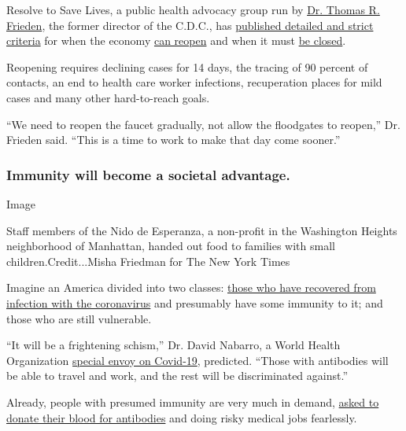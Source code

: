 Resolve to Save Lives, a public health advocacy group run by
\href{https://resolvetosavelives.org/about/team/tom-frieden}{Dr. Thomas
R. Frieden}, the former director of the C.D.C., has
\href{https://vitalstrategies.zoom.us/rec/play/uJUkIe2t-m83SYeSsgSDA6UsW426e6qs1iBIq6Zeyk7kUHkCZlL0YLcSZOrv8sWG1OUPpKL9uf0WUssz?continueMode=true}{published
detailed and strict criteria} for when the economy
\href{https://preventepidemics.org/wp-content/uploads/2020/04/COV020_WhenHowLoosenFaucet_v4.pdf}{can
reopen} and when it must
\href{https://preventepidemics.org/wp-content/uploads/2020/04/COV020_WhenHowTightenFaucet_v3.pdf}{be
closed}.

Reopening requires declining cases for 14 days, the tracing of 90
percent of contacts, an end to health care worker infections,
recuperation places for mild cases and many other hard-to-reach goals.

``We need to reopen the faucet gradually, not allow the floodgates to
reopen,'' Dr. Frieden said. ``This is a time to work to make that day
come sooner.''

\hypertarget{immunity-will-become-a-societal-advantage}{%
\subsubsection{Immunity will become a societal
advantage.}\label{immunity-will-become-a-societal-advantage}}

Image

Staff members of the Nido de Esperanza, a non-profit in the Washington
Heights neighborhood of Manhattan, handed out food to families with
small children.Credit...Misha Friedman for The New York Times

Imagine an America divided into two classes:
\href{https://www.nytimes.com/2020/04/11/us/coronavirus-survivors.html}{those
who have recovered from infection with the coronavirus} and presumably
have some immunity to it; and those who are still vulnerable.

``It will be a frightening schism,'' Dr. David Nabarro, a World Health
Organization
\href{https://www.who.int/dg/speeches/detail/who-director-general-s-opening-remarks-at-the-media-briefing-on-covid-19-on-21-february-2020}{special
envoy on Covid-19}, predicted. ``Those with antibodies will be able to
travel and work, and the rest will be discriminated against.''

Already, people with presumed immunity are very much in demand,
\href{https://www.medicinenet.com/script/main/art.asp?articlekey=229963}{asked
to donate their blood for antibodies} and doing risky medical jobs
fearlessly.

